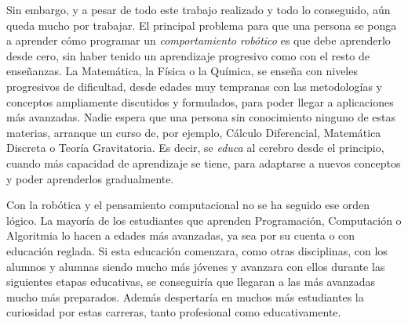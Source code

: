 Sin embargo, y a pesar de todo este trabajo realizado y todo lo conseguido, aún queda mucho por trabajar. El principal problema para que una persona se ponga a aprender cómo programar un \textit{comportamiento robótico} es que debe aprenderlo desde cero, sin haber tenido un aprendizaje progresivo como con el resto de enseñanzas. La Matemática, la Física o la Química, se enseña con niveles progresivos de dificultad, desde edades muy tempranas con las metodologías y conceptos ampliamente discutidos y formulados, para poder llegar a aplicaciones más avanzadas. Nadie espera que una persona sin conocimiento ninguno de estas materias, arranque  un curso de, por ejemplo, Cálculo Diferencial, Matemática Discreta o Teoría Gravitatoria. Es decir, se \textit{educa} al cerebro desde el principio, cuando más capacidad de aprendizaje se tiene, para adaptarse a nuevos conceptos y poder aprenderlos gradualmente. \\
\par Con la robótica y el pensamiento computacional no se ha seguido ese orden lógico. La mayoría de los estudiantes que aprenden Programación, Computación o Algoritmia lo hacen a edades más avanzadas, ya sea por su cuenta o con educación reglada. Si esta educación comenzara, como otras disciplinas, con los alumnos y alumnas siendo mucho más jóvenes y avanzara con ellos durante las siguientes etapas educativas, se conseguiría que llegaran a las más avanzadas mucho más preparados. Además despertaría en muchos más estudiantes la curiosidad por estas carreras, tanto profesional como educativamente.\\

